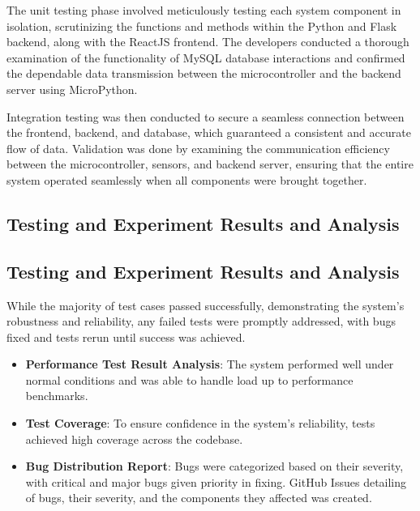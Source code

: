The unit testing phase involved meticulously testing each system component in isolation,
scrutinizing the functions and methods within the Python and Flask backend, along
with the ReactJS frontend. %
The developers conducted a thorough examination of the functionality of MySQL database interactions and confirmed the dependable data
transmission between the microcontroller and the backend server using MicroPython. %

Integration testing was then conducted to secure a seamless connection between
the frontend, backend, and database, which guaranteed a consistent and accurate
flow of data. %
Validation was done by examining the communication efficiency between the microcontroller, sensors, and backend server, ensuring that the entire system
operated seamlessly when all components were brought together. %

\subsection{Testing and Experiment Results and Analysis}\label{subsec:testing-and-experiment-results-and-analysis}

\subsection{Testing and Experiment Results and Analysis}

While the majority of test cases passed successfully, demonstrating the system’s
robustness and reliability, any failed tests were promptly addressed,
with bugs fixed and tests rerun until success was achieved. %

\begin{itemize}
    \item \textbf{Performance Test Result Analysis}: The system performed well
    under normal conditions and was able to handle load up to performance benchmarks. %
    \item \textbf{Test Coverage}: To ensure confidence in the system’s reliability,
    tests achieved high coverage across the codebase. %
    \item \textbf{Bug Distribution Report}: Bugs were categorized based on their
    severity, with critical and major bugs given priority in fixing.  %
    GitHub Issues detailing of bugs, their severity, and the components
    they affected was created. %
\end{itemize}

